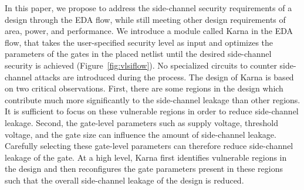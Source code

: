 In this paper, we propose to address the side-channel security requirements of a design through the EDA flow, while still meeting other design requirements of area, power, and performance. We introduce a module called \textsf{Karna} in the EDA flow, that takes the user-specified security level as input and optimizes the parameters of the gates in the placed netlist until the desired side-channel security is achieved (Figure~\ref{fig:vlsiflow}). No specialized circuits to counter side-channel attacks are introduced during the process. The design of \textsf{Karna} is based on two critical observations. First, there are some regions in the design which contribute much more significantly to the side-channel leakage than other regions. It is sufficient to focus on these vulnerable regions in order to reduce side-channel leakage. Second, the gate-level parameters such as supply voltage, threshold voltage, and the gate size can influence the amount of side-channel leakage. 
Carefully selecting these gate-level parameters can therefore reduce side-channel leakage of the gate. 
At a high level, {\sf Karna} first identifies vulnerable regions in the design and then reconfigures the gate parameters present in these regions such that the overall side-channel leakage of the design is reduced. 


